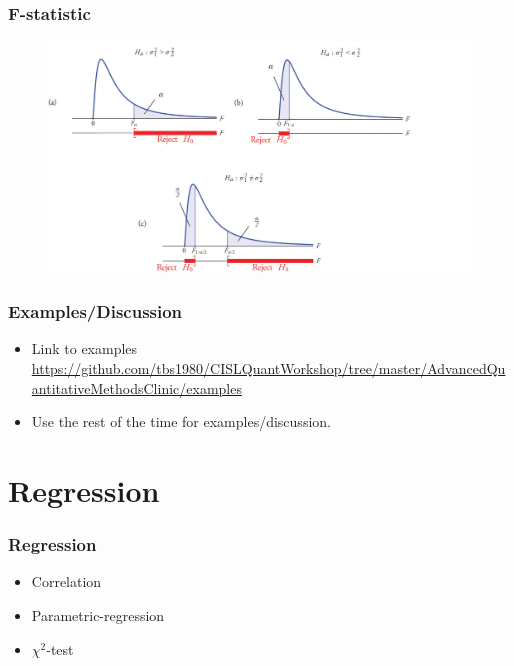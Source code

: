 \documentclass[10pt, compress]{beamer}
\begin{document}
\begin{frame}
    \frametitle{F-statistic}
    \begin{figure}
        \begin{centering}
            \includegraphics[scale=0.7]{img/ftest.png}
        \end{centering}
    \end{figure}
\end{frame}

\begin{frame}
    \frametitle{Examples/Discussion}
    \begin{itemize}
        \item Link to examples \url{https://github.com/tbs1980/CISLQuantWorkshop/tree/master/AdvancedQuantitativeMethodsClinic/examples}
        \item Use the rest of the time for examples/discussion.
    \end{itemize}
\end{frame}

\section{Regression}

\begin{frame}
    \frametitle{Regression}
    \begin{itemize}
        \item Correlation
        \item Parametric-regression
        \item $\chi^2$-test
    \end{itemize}
\end{frame}
\end{document}
